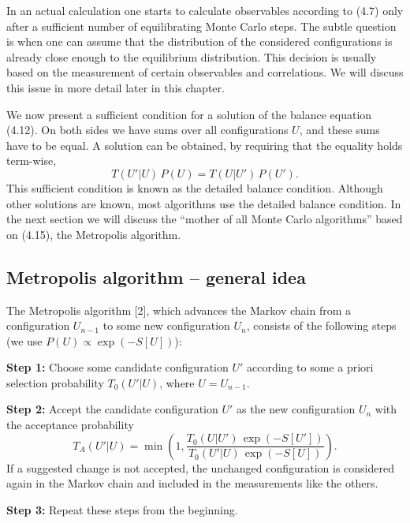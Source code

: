 In an actual calculation one starts to calculate observables according to
(4.7) only after a sufficient number of equilibrating Monte Carlo steps. The
subtle question is when one can assume that the distribution of the considered configurations is already close enough to the equilibrium distribution.
This decision is usually based on the measurement of certain observables and
correlations. We will discuss this issue in more detail later in this chapter.

We now present a sufficient condition for a solution of the balance equation
(4.12). On both sides we have sums over all configurations $U$, and these sums
have to be equal. A solution can be obtained, by requiring that the equality
holds term-wise,
\begin{equation}
  T(U'|U)\,P(U) = T(U|U')\,P(U').
\end{equation}
This sufficient condition is known as the detailed balance condition. Although
other solutions are known, most algorithms use the detailed balance condition.
In the next section we will discuss the ``mother of all Monte Carlo algorithms''
based on (4.15), the Metropolis algorithm.

\subsection{Metropolis algorithm -- general idea}

The Metropolis algorithm [2], which advances the Markov chain from a configuration $U_{n-1}$ to some new configuration $U_n$, consists of the following steps
(we use $P(U) \propto \exp(-S[U])$):

\textbf{Step 1:} Choose some candidate configuration $U'$ according to some a priori
selection probability $T_0(U'|U)$, where $U = U_{n-1}$.

\textbf{Step 2:} Accept the candidate configuration $U'$ as the new configuration $U_n$
with the acceptance probability
\begin{equation}
  T_A(U'|U) = \min\!\left(1, \frac{T_0(U|U')\,\exp(-S[U'])}{T_0(U'|U)\,\exp(-S[U])}\right).
\end{equation}
If a suggested change is not accepted, the unchanged configuration is
considered again in the Markov chain and included in the measurements
like the others.

\textbf{Step 3:} Repeat these steps from the beginning.

